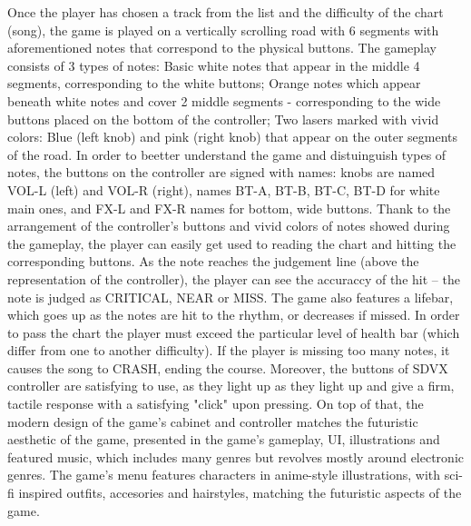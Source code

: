 Once the player has chosen a track from the list and the difficulty of the chart (song), the game is played on a vertically scrolling road with 6 segments with aforementioned notes that correspond to the physical buttons. The gameplay consists of 3 types of notes: Basic white notes that appear in the middle 4 segments, corresponding to the white buttons; Orange notes which appear beneath white notes and cover 2 middle segments - corresponding to the wide buttons placed on the bottom of the controller; Two lasers marked with vivid colors: Blue (left knob) and pink (right knob) that appear on the outer segments of the road. In order to beetter understand the game and distuinguish types of notes, the buttons on the controller are signed with names: knobs are named VOL-L (left) and VOL-R (right), names BT-A, BT-B, BT-C, BT-D for white main ones, and FX-L and FX-R names for bottom, wide buttons. Thank to the arrangement of the controller's buttons and vivid colors of notes showed during the gameplay, the player can easily get used to reading the chart and hitting the corresponding buttons. As the note reaches the judgement line (above the representation of the controller), the player can see the accuraccy of the hit -- the note is judged as CRITICAL, NEAR or MISS. The game also features a lifebar, which goes up as the notes are hit to the rhythm, or decreases if missed. In order to pass the chart the player must exceed the particular level of health bar (which differ from one to another difficulty). If the player is missing too many notes, it causes the song to CRASH, ending the course. Moreover, the buttons of SDVX controller are satisfying to use, as they light up as they light up and give a firm, tactile response with a satisfying "click" upon pressing. On top of that, the modern design of the game's cabinet and controller matches the futuristic aesthetic of the game, presented in the game's gameplay, UI, illustrations and featured music, which includes many genres but revolves mostly around electronic genres. The game's menu features characters in anime-style illustrations, with sci-fi inspired outfits, accesories and hairstyles, matching the futuristic aspects of the game. 

